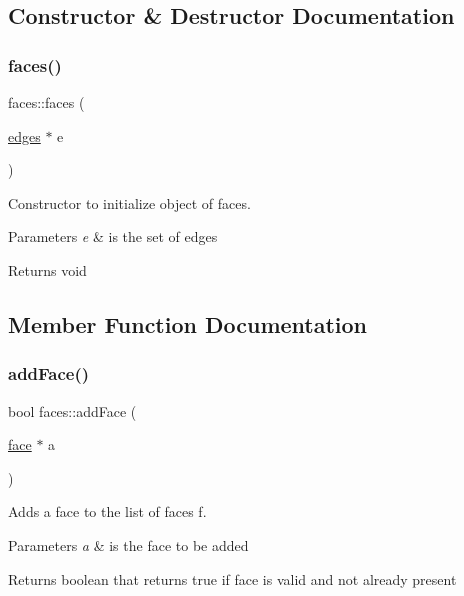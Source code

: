 \subsection{Constructor \& Destructor Documentation}
\mbox{\label{classfaces_a0243aedce9f1e840916474a184c487c9}} 
\subsubsection{\texorpdfstring{faces()}{faces()}}
{\footnotesize\ttfamily faces\+::faces (\begin{DoxyParamCaption}\item[{\mbox{\hyperlink{classedges}{edges}} $\ast$}]{e }\end{DoxyParamCaption})}



Constructor to initialize object of faces. 


\begin{DoxyParams}{Parameters}
{\em e} & is the set of edges \\
\hline
\end{DoxyParams}
\begin{DoxyReturn}{Returns}
void 
\end{DoxyReturn}


\subsection{Member Function Documentation}
\mbox{\label{classfaces_acf9ea2364fe3e8886057170f0071663c}} 
\subsubsection{\texorpdfstring{add\+Face()}{addFace()}}
{\footnotesize\ttfamily bool faces\+::add\+Face (\begin{DoxyParamCaption}\item[{\mbox{\hyperlink{structface}{face}} $\ast$}]{a }\end{DoxyParamCaption})}



Adds a face to the list of faces f. 


\begin{DoxyParams}{Parameters}
{\em a} & is the face to be added \\
\hline
\end{DoxyParams}
\begin{DoxyReturn}{Returns}
boolean that returns true if face is valid and not already present 
\end{DoxyReturn}
\mbox{\label{classfaces_a538a694eaec8c4d5759b87f688f0405b}} 

